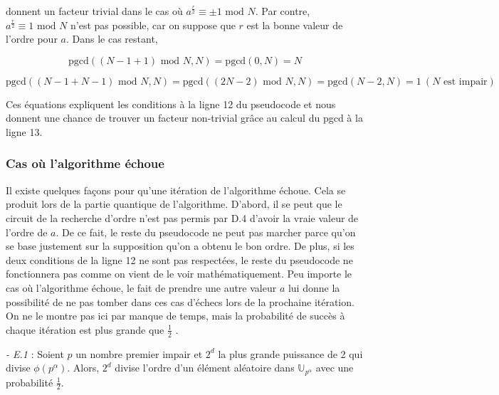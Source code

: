 donnent un facteur trivial dans le cas où $a^{\frac{r}{2}} \equiv \pm 1 \text{ mod } N$. Par contre, $a^{\frac{r}{2}} \equiv 1 \text{ mod } N$ n'est pas possible, car on suppose que $r$ est la bonne valeur de l'ordre pour $a$. Dans le cas restant,

\begin{equation*}
    \text{pgcd}((N - 1 + 1) \text{ mod } N, N) = \text{pgcd}(0, N) = N
\end{equation*}

\begin{equation*}
    \text{pgcd}((N - 1 + N - 1) \text{ mod } N, N) = \text{pgcd}((2N - 2) \text{ mod } N, N) = \text{pgcd}(N-2, N) = 1 \ (\text{$N$ est impair})
\end{equation*}

Ces équations expliquent les conditions à la ligne 12 du pseudocode et nous donnent une chance de trouver un facteur non-trivial grâce au calcul du pgcd à la ligne 13.

\subsubsection*{Cas où l'algorithme échoue}
Il existe quelques façons pour qu'une itération de l'algorithme échoue. Cela se produit lors de la partie quantique de l'algorithme. D'abord, il se peut que le circuit de la recherche d'ordre n'est pas permis par D.4 d'avoir la vraie valeur de l'ordre de $a$. De ce fait, le reste du pseudocode ne peut pas marcher parce qu'on se base justement sur la supposition qu'on a obtenu le bon ordre. De plus, si les deux conditions de la ligne 12 ne sont pas respectées, le reste du pseudocode ne fonctionnera pas comme on vient de le voir mathématiquement. Peu importe le cas où l'algorithme échoue, le fait de prendre une autre valeur $a$ lui donne la possibilité de ne pas tomber dans ces cas d'échecs lors de la prochaine itération. On ne le montre pas ici par manque de temps, mais la probabilité de succès à chaque itération est plus grande que $\frac{1}{2}$ \cite{nielsen00} \cite{Shor_1997}.

\textit{- E.1} : Soient $p$ un nombre premier impair et $2^d$ la plus grande puissance de 2 qui divise $\phi(p^{\alpha})$. Alors, $2^d$ divise l'ordre d'un élément aléatoire dans $\mathbb{U}_{p^{\alpha}}$ avec une probabilité $\frac{1}{2}$.

